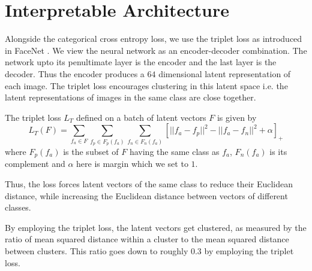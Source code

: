 \documentclass{article}
\begin{document}
\begin{sloppypar}
    \section{Interpretable Architecture}
    Alongside the categorical cross entropy loss, we use the triplet loss as introduced in FaceNet \cite{facenet}. We view the neural network as an encoder-decoder combination.
    The network upto its penultimate layer is the encoder and the last layer is the decoder. Thus the encoder produces a $64$ dimensional latent representation of each image. 
    The triplet loss encourages clustering in this latent space i.e. the latent representations of images in the same class are close together.
    \par The triplet loss $L_T$ defined on a batch of latent vectors $F$ is given by 
    \begin{equation*}
        L_T(F) = \sum_{f_a \in F} \sum_{f_p \in F_p(f_a)} \sum_{f_n \in F_n(f_a)} [ ||f_a - f_p||^2 - ||f_a - f_n||^2 + \alpha ]_+
    \end{equation*}
    where $F_p(f_a)$ is the subset of $F$ having the same class as $f_a$, $F_n(f_a)$ is its complement and $\alpha$ here is margin which we set to $1$.
    \par Thus, the loss forces latent vectors of the same class to reduce their Euclidean distance, while increasing the Euclidean distance between vectors of different classes.
    \par By employing the triplet loss, the latent vectors get clustered, as measured by the ratio of mean squared distance within a cluster to the mean squared distance between clusters.
    This ratio goes down to roughly $0.3$ by employing the triplet loss.


\end{sloppypar}
\end{document}
